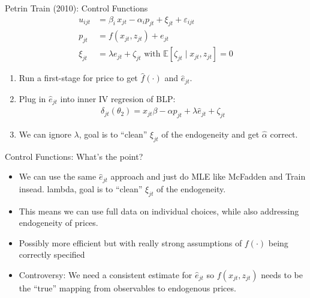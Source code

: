 \documentclass[aspectratio=169,10pt]{beamer}
\begin{document}
\begin{frame}{Petrin Train (2010): Control Functions}
\begin{align*}
u_{ijt} &=  \beta_i\, x_{jt} - \alpha_i p_{jt} + \xi_{jt} + \varepsilon_{ijt} \\
p_{jt} &= f(x_{jt}, z_{jt}) + e_{jt}\\
\xi_{jt} &= \lambda e_{jt} + \zeta_{jt}  \text{ with } \mathbb{E}[\zeta_{jt} \mid  x_{jt}, z_{jt}]=0 
\end{align*}
\begin{enumerate}
\item Run a first-stage for price to get $\hat{f}(\cdot)$ and $\hat{e}_{jt}$.
\item Plug in $\hat{e}_{jt}$ into inner IV regresion of BLP:
\begin{align*}
\delta_{jt}(\theta_2) = x_{jt} \beta -\alpha p_{jt}+ \lambda \hat{e}_{jt} + \zeta_{jt}
 \end{align*}
 \item We can ignore $\lambda$, goal is to ``clean'' $\xi_{jt}$ of the endogeneity and get $\widehat{\alpha}$ correct.
\end{enumerate}
\end{frame}


\begin{frame}{Control Functions: What's the point?}
\begin{itemize}
\item We can use the same $\hat{e}_{jt}$ approach and just do MLE like McFadden and Train insead.
lambda, goal is to ``clean'' $\xi_{jt}$ of the endogeneity.
\item This means we can use full data on individual choices, while also addressing endogeneity of prices.
\item Possibly more efficient but with really strong assumptions of $f(\cdot)$ being correctly specified
\item Controversy: We need a consistent estimate for $\hat{e}_{jt}$ so $f(x_{jt}, z_{jt})$ needs to be the ``true'' mapping from observables to endogenous prices.
\end{itemize}
\end{frame}
\end{document}
